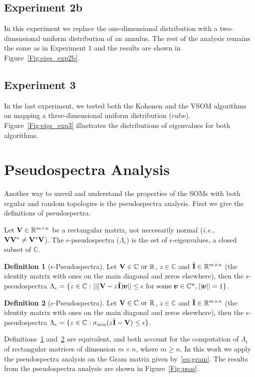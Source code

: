 \documentclass[10pt]{article}
\theoremstyle{definition}
\newtheorem{definition}{Definition}[section]
\begin{document}
\subsection*{Experiment 2b}
In this experiment we replace the one-dimensional distribution with a
two-dimensional uniform distribution of an annulus. The rest of the analysis 
remains the same as in Experiment $1$ and the results are shown in
Figure~\ref{Fig:eigs_exp2b}.

\subsection*{Experiment 3}
In the last experiment, we tested both the Kohonen and the VSOM algorithms 
on mapping a three-dimensional uniform distribution (cube). 
Figure~\ref{Fig:eigs_exp3} illustrates the distributions of eigenvalues for 
both algorithms.


\section*{Pseudospectra Analysis}

Another way to unveil and understand the properties of the SOMs with both 
regular and random topologies is the pseudospectra analysis. First we give 
the definitions of pseudospectra. 

Let ${\bf V} \in \mathbb{R}^{m \times n}$ be a rectangular matrix, not
necessarily normal (\emph{i.e.}, ${\bf V}{\bf V}^{*} \neq {\bf V}^{*}{\bf V}$).
The $\epsilon$-pseudospectra ($\Lambda_{\epsilon}$) is the set of 
$\epsilon$-eigenvalues, a closed subset of $\mathbb{C}$.
\begin{definition}[$\epsilon$-Pseudospectra]
	\label{def:psd1}
    Let ${\bf V} \in \mathbb{C} \text{ or } \mathbb{R}$, 
    $z \in \mathbb{C}$ and $\tilde{{\bf I}} \in \mathbb{R}^{m \times n}$ (the identity 
    matrix with ones on the main diagonal and zeros elsewhere), then the $\epsilon$-pseudospectra
    $\Lambda_{\epsilon} = \{z \in \mathbb{C}: ||({\bf V} - z\tilde{{\bf I}}){\pmb \upsilon}||\leq \epsilon
    \text{ for some } \pmb{\upsilon} \in \mathbb{C}^n, ||\pmb{\upsilon}|| = 1\}$.
\end{definition}
\begin{definition}[$\epsilon$-Pseudospectra]
	\label{def:psd2}
    Let ${\bf V} \in \mathbb{C} \text{ or } \mathbb{R}$, 
    $z \in \mathbb{C}$ and $\tilde{{\bf I}} \in \mathbb{R}^{m \times n}$ (the identity 
    matrix with ones on the main diagonal and zeros elsewhere), then the $\epsilon$-pseudospectra
    $\Lambda_{\epsilon} = \{z \in \mathbb{C}: \sigma_{\min}(z\tilde{{\bf I}}-{\bf V})\leq \epsilon \}$.
\end{definition}
Definitions~\ref{def:psd1} and~\ref{def:psd2} are equivalent, and both 
account for the computation of $\Lambda_{\epsilon}$ of rectangular matrices of dimension
$m \times n$, where $m \geq n$. In this work we apply the pseudospectra 
analysis on the Gram matrix given by~\eqref{eq:gram}. 
The results from the pseudospectra analysis are shown in Figure~\ref{Fig:psas}. 
\end{document}
